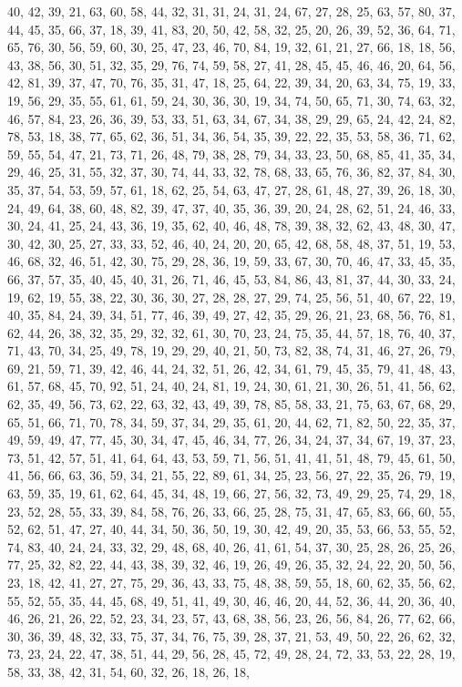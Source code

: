 \documentclass[
]{article}
\begin{document}
\begin{Schunk}
\begin{Soutput}
40, 42, 39, 21, 63, 60, 58, 44, 32, 31, 31, 24, 31, 24, 67, 27, 28, 25, 63, 57, 80, 37, 44, 45, 35, 66, 37, 18, 39, 41, 83, 20, 50, 42, 58, 32, 25, 20, 26, 39, 52, 36, 64, 71, 65, 76, 30, 56, 59, 60, 30, 25, 47, 23, 46, 70, 84, 19, 32, 61, 21, 27, 66, 18, 18, 56, 43, 38, 56, 30, 51, 32, 35, 29, 76, 74, 59, 58, 27, 41, 28, 45, 45, 46, 46, 20, 64, 56, 42, 81, 39, 37, 47, 70, 76, 35, 31, 47, 18, 25, 64, 22, 39, 34, 20, 63, 34, 75, 19, 33, 19, 56, 29, 35, 55, 61, 61, 59, 24, 30, 36, 30, 19, 34, 74, 50, 65, 71, 30, 74, 63, 32, 46, 57, 84, 23, 26, 36, 39, 53, 33, 51, 63, 34, 67, 34, 38, 29, 29, 65, 24, 42, 24, 82, 78, 53, 18, 38, 77, 65, 62, 36, 51, 34, 36, 54, 35, 39, 22, 22, 35, 53, 58, 36, 71, 62, 59, 55, 54, 47, 21, 73, 71, 26, 48, 79, 38, 28, 79, 34, 33, 23, 50, 68, 85, 41, 35, 34, 29, 46, 25, 31, 55, 32, 37, 30, 74, 44, 33, 32, 78, 68, 33, 65, 76, 36, 82, 37, 84, 30, 35, 37, 54, 53, 59, 57, 61, 18, 62, 25, 54, 63, 47, 27, 28, 61, 48, 27, 39, 26, 18, 30, 24, 49, 64, 38, 60, 48, 82, 39, 47, 37, 40, 35, 36, 39, 20, 24, 28, 62, 51, 24, 46, 33, 30, 24, 41, 25, 24, 43, 36, 19, 35, 62, 40, 46, 48, 78, 39, 38, 32, 62, 43, 48, 30, 47, 30, 42, 30, 25, 27, 33, 33, 52, 46, 40, 24, 20, 20, 65, 42, 68, 58, 48, 37, 51, 19, 53, 46, 68, 32, 46, 51, 42, 30, 75, 29, 28, 36, 19, 59, 33, 67, 30, 70, 46, 47, 33, 45, 35, 66, 37, 57, 35, 40, 45, 40, 31, 26, 71, 46, 45, 53, 84, 86, 43, 81, 37, 44, 30, 33, 24, 19, 62, 19, 55, 38, 22, 30, 36, 30, 27, 28, 28, 27, 29, 74, 25, 56, 51, 40, 67, 22, 19, 40, 35, 84, 24, 39, 34, 51, 77, 46, 39, 49, 27, 42, 35, 29, 26, 21, 23, 68, 56, 76, 81, 62, 44, 26, 38, 32, 35, 29, 32, 32, 61, 30, 70, 23, 24, 75, 35, 44, 57, 18, 76, 40, 37, 71, 43, 70, 34, 25, 49, 78, 19, 29, 29, 40, 21, 50, 73, 82, 38, 74, 31, 46, 27, 26, 79, 69, 21, 59, 71, 39, 42, 46, 44, 24, 32, 51, 26, 42, 34, 61, 79, 45, 35, 79, 41, 48, 43, 61, 57, 68, 45, 70, 92, 51, 24, 40, 24, 81, 19, 24, 30, 61, 21, 30, 26, 51, 41, 56, 62, 62, 35, 49, 56, 73, 62, 22, 63, 32, 43, 49, 39, 78, 85, 58, 33, 21, 75, 63, 67, 68, 29, 65, 51, 66, 71, 70, 78, 34, 59, 37, 34, 29, 35, 61, 20, 44, 62, 71, 82, 50, 22, 35, 37, 49, 59, 49, 47, 77, 45, 30, 34, 47, 45, 46, 34, 77, 26, 34, 24, 37, 34, 67, 19, 37, 23, 73, 51, 42, 57, 51, 41, 64, 64, 43, 53, 59, 71, 56, 51, 41, 41, 51, 48, 79, 45, 61, 50, 41, 56, 66, 63, 36, 59, 34, 21, 55, 22, 89, 61, 34, 25, 23, 56, 27, 22, 35, 26, 79, 19, 63, 59, 35, 19, 61, 62, 64, 45, 34, 48, 19, 66, 27, 56, 32, 73, 49, 29, 25, 74, 29, 18, 23, 52, 28, 55, 33, 39, 84, 58, 76, 26, 33, 66, 25, 28, 75, 31, 47, 65, 83, 66, 60, 55, 52, 62, 51, 47, 27, 40, 44, 34, 50, 36, 50, 19, 30, 42, 49, 20, 35, 53, 66, 53, 55, 52, 74, 83, 40, 24, 24, 33, 32, 29, 48, 68, 40, 26, 41, 61, 54, 37, 30, 25, 28, 26, 25, 26, 77, 25, 32, 82, 22, 44, 43, 38, 39, 32, 46, 19, 26, 49, 26, 35, 32, 24, 22, 20, 50, 56, 23, 18, 42, 41, 27, 27, 75, 29, 36, 43, 33, 75, 48, 38, 59, 55, 18, 60, 62, 35, 56, 62, 55, 52, 55, 35, 44, 45, 68, 49, 51, 41, 49, 30, 46, 46, 20, 44, 52, 36, 44, 20, 36, 40, 46, 26, 21, 26, 22, 52, 23, 34, 23, 57, 43, 68, 38, 56, 23, 26, 56, 84, 26, 77, 62, 66, 30, 36, 39, 48, 32, 33, 75, 37, 34, 76, 75, 39, 28, 37, 21, 53, 49, 50, 22, 26, 62, 32, 73, 23, 24, 22, 47, 38, 51, 44, 29, 56, 28, 45, 72, 49, 28, 24, 72, 33, 53, 22, 28, 19, 58, 33, 38, 42, 31, 54, 60, 32, 26, 18, 26, 18, 
\end{Soutput}
\end{Schunk}
\end{document}
